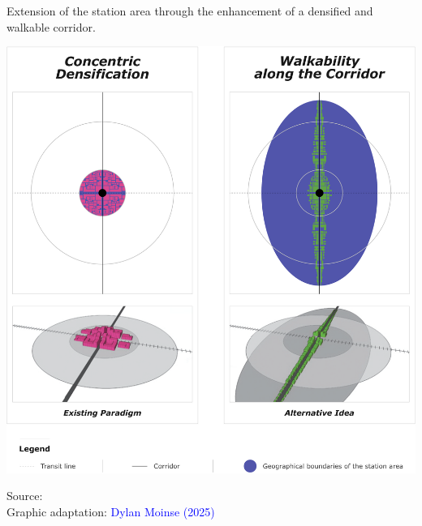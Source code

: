 \begin{refsegment}
\begin{carte}[h!]\vspace*{4pt}
    \caption{Extension of the station area through the enhancement of a densified and walkable corridor.}
    \label{fig-chap1:tod-corridor-pieton}
    \centerline{\includegraphics[width=1\columnwidth]{src/Figures/Chap-1/EN_Corridor_pieton.pdf}}
    \vspace{5pt}
    \begin{flushright}\scriptsize{
    Source: \textcolor{blue}{\textcite[163]{park_can_2015}}
    \\
    Graphic adaptation: \textcolor{blue}{Dylan Moinse (2025)}
    }\end{flushright}
\end{carte}


\end{refsegment}
